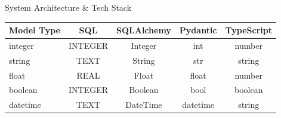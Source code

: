 \documentclass[10pt,aspectratio=169]{beamer}
\begin{document}
\begin{frame}{System Architecture \& Tech Stack}
\begin{center}
\scriptsize
\setlength{\tabcolsep}{2pt}
\begin{tabular}{l|c|c|c|c}
\toprule
\textbf{Model Type} & \textbf{SQL} & \textbf{SQLAlchemy} & \textbf{Pydantic} & \textbf{TypeScript} \\
\midrule
integer & INTEGER & Integer & int & number \\
string  & TEXT    & String  & str & string \\
float   & REAL    & Float   & float & number \\
boolean & INTEGER & Boolean & bool & boolean \\
datetime & TEXT   & DateTime & datetime & string \\
\bottomrule
\end{tabular}
\end{center}
\end{frame}

\end{document}
